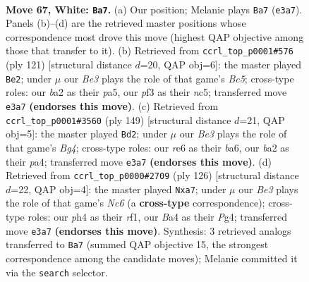 \documentclass[11pt]{article}
\begin{document}
\clearpage

\begin{figure}[p]\centering
\begin{subfigure}{0.46\textwidth}\centering
\resizebox{\linewidth}{!}{%
\newchessgame
\chessboard[
  setfen={2R5/6k1/4r3/8/B3p2p/4Bp1P/b4P2/7K w - - 44 67},
  showmover=false,
  pgfstyle=straightmove, color=movearrow, markmove={e3-a7}
]}
\caption{}
\end{subfigure}\hfill
\begin{subfigure}{0.46\textwidth}\centering
\resizebox{\linewidth}{!}{%
\newchessgame
\chessboard[
  setfen={8/2k5/8/PpN1p3/1Pb1P2K/5R2/8/6r1 b - - 22 61},
  showmover=false,
  pgfstyle=straightmove, color=movearrow, markmove={c4-e2}
]}
\caption{}
\end{subfigure}
\\[4pt]
\begin{subfigure}{0.46\textwidth}\centering
\resizebox{\linewidth}{!}{%
\newchessgame
\chessboard[
  setfen={1k6/3K4/Bp3p2/5Pb1/PP4Pp/8/8/8 b - - 8 75},
  showmover=false,
  pgfstyle=straightmove, color=movearrow, markmove={g5-d2}
]}
\caption{}
\end{subfigure}\hfill
\begin{subfigure}{0.46\textwidth}\centering
\resizebox{\linewidth}{!}{%
\newchessgame
\chessboard[
  setfen={4k3/bPB5/2N2p2/3p2p1/6P1/1KP5/8/5r2 w - - 19 64},
  showmover=false,
  pgfstyle=straightmove, color=movearrow, markmove={c6-a7}
]}
\caption{}
\end{subfigure}
\caption{\textbf{Move 67, White: \texttt{Ba7}.} (a) Our position; Melanie plays \texttt{Ba7} (\texttt{e3a7}). Panels (b)--(d) are the retrieved master positions whose correspondence most drove this move (highest QAP objective among those that transfer to it). (b) Retrieved from \texttt{ccrl\_top\_p0001\#576} (ply 121) [structural distance $d$=20, QAP obj=6]: the master played \texttt{Be2}; under $\mu$ our \emph{Be3} plays the role of that game's \emph{Bc5}; cross-type roles: our \emph{b}a2 as their \emph{p}a5, our \emph{p}f3 as their \emph{n}c5; transferred move \texttt{e3a7} \textbf{(endorses this move)}. (c) Retrieved from \texttt{ccrl\_top\_p0001\#3560} (ply 149) [structural distance $d$=21, QAP obj=5]: the master played \texttt{Bd2}; under $\mu$ our \emph{Be3} plays the role of that game's \emph{Bg4}; cross-type roles: our \emph{r}e6 as their \emph{b}a6, our \emph{b}a2 as their \emph{p}a4; transferred move \texttt{e3a7} \textbf{(endorses this move)}. (d) Retrieved from \texttt{ccrl\_top\_p0000\#2709} (ply 126) [structural distance $d$=22, QAP obj=4]: the master played \texttt{Nxa7}; under $\mu$ our \emph{Be3} plays the role of that game's \emph{Nc6} (a \textbf{cross-type} correspondence); cross-type roles: our \emph{p}h4 as their \emph{r}f1, our \emph{B}a4 as their \emph{P}g4; transferred move \texttt{e3a7} \textbf{(endorses this move)}. Synthesis: 3 retrieved analogs transferred to \texttt{Ba7} (summed QAP objective 15, the strongest correspondence among the candidate moves); Melanie committed it via the \texttt{search} selector.}
\label{fig:thought-m132}
\end{figure}
\end{document}
